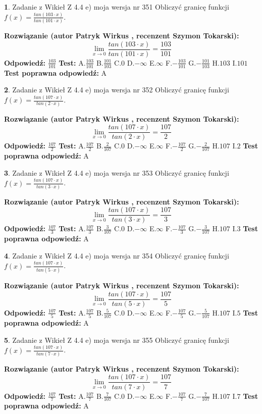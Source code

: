 \documentclass[12pt, a4paper]{article}
\theoremstyle{definition} %
\newtheorem{zad}{}
\newcommand{\zadStart}[1]{\begin{zad}#1\newline}
\newcommand{\zadStop}{\end{zad}}
\newcommand{\rozwStart}[2]{\noindent \textbf{Rozwiązanie (autor #1 , recenzent #2): }\newline}
\newcommand{\rozwStop}{\newline}
\newcommand{\odpStart}{\noindent \textbf{Odpowiedź:}\newline}
\newcommand{\odpStop}{\newline}
\newcommand{\testStart}{\noindent \textbf{Test:}\newline}
\newcommand{\testStop}{\newline}
\newcommand{\kluczStart}{\noindent \textbf{Test poprawna odpowiedź:}\newline}
\newcommand{\kluczStop}{\newline}
\begin{document}
\zadStart{Zadanie z Wikieł Z 4.4 e) moja wersja nr 351}
Obliczyć granicę funkcji $f(x)=\frac{tan(103\cdot x)}{tan(101\cdot x)}$.
\zadStop
\rozwStart{Patryk Wirkus}{Szymon Tokarski}
$$\lim\limits_{x\to 0}\frac{tan(103\cdot x)}{tan(101\cdot x)}=
\frac{103}{101}$$
\rozwStop
\odpStart
$\frac{103}{101}$
\odpStop
\testStart
A.$\frac{103}{101}$
B.$\frac{101}{103}$
C.$0$
D.$-\infty$
E.$\infty$
F.$-\frac{103}{101}$
G.$-\frac{101}{103}$
H.$103$
I.$101$
\testStop
\kluczStart
A
\kluczStop



\zadStart{Zadanie z Wikieł Z 4.4 e) moja wersja nr 352}
Obliczyć granicę funkcji $f(x)=\frac{tan(107\cdot x)}{tan(2\cdot x)}$.
\zadStop
\rozwStart{Patryk Wirkus}{Szymon Tokarski}
$$\lim\limits_{x\to 0}\frac{tan(107\cdot x)}{tan(2\cdot x)}=
\frac{107}{2}$$
\rozwStop
\odpStart
$\frac{107}{2}$
\odpStop
\testStart
A.$\frac{107}{2}$
B.$\frac{2}{107}$
C.$0$
D.$-\infty$
E.$\infty$
F.$-\frac{107}{2}$
G.$-\frac{2}{107}$
H.$107$
I.$2$
\testStop
\kluczStart
A
\kluczStop



\zadStart{Zadanie z Wikieł Z 4.4 e) moja wersja nr 353}
Obliczyć granicę funkcji $f(x)=\frac{tan(107\cdot x)}{tan(3\cdot x)}$.
\zadStop
\rozwStart{Patryk Wirkus}{Szymon Tokarski}
$$\lim\limits_{x\to 0}\frac{tan(107\cdot x)}{tan(3\cdot x)}=
\frac{107}{3}$$
\rozwStop
\odpStart
$\frac{107}{3}$
\odpStop
\testStart
A.$\frac{107}{3}$
B.$\frac{3}{107}$
C.$0$
D.$-\infty$
E.$\infty$
F.$-\frac{107}{3}$
G.$-\frac{3}{107}$
H.$107$
I.$3$
\testStop
\kluczStart
A
\kluczStop



\zadStart{Zadanie z Wikieł Z 4.4 e) moja wersja nr 354}
Obliczyć granicę funkcji $f(x)=\frac{tan(107\cdot x)}{tan(5\cdot x)}$.
\zadStop
\rozwStart{Patryk Wirkus}{Szymon Tokarski}
$$\lim\limits_{x\to 0}\frac{tan(107\cdot x)}{tan(5\cdot x)}=
\frac{107}{5}$$
\rozwStop
\odpStart
$\frac{107}{5}$
\odpStop
\testStart
A.$\frac{107}{5}$
B.$\frac{5}{107}$
C.$0$
D.$-\infty$
E.$\infty$
F.$-\frac{107}{5}$
G.$-\frac{5}{107}$
H.$107$
I.$5$
\testStop
\kluczStart
A
\kluczStop



\zadStart{Zadanie z Wikieł Z 4.4 e) moja wersja nr 355}
Obliczyć granicę funkcji $f(x)=\frac{tan(107\cdot x)}{tan(7\cdot x)}$.
\zadStop
\rozwStart{Patryk Wirkus}{Szymon Tokarski}
$$\lim\limits_{x\to 0}\frac{tan(107\cdot x)}{tan(7\cdot x)}=
\frac{107}{7}$$
\rozwStop
\odpStart
$\frac{107}{7}$
\odpStop
\testStart
A.$\frac{107}{7}$
B.$\frac{7}{107}$
C.$0$
D.$-\infty$
E.$\infty$
F.$-\frac{107}{7}$
G.$-\frac{7}{107}$
H.$107$
I.$7$
\testStop
\kluczStart
A
\kluczStop
\end{document}
